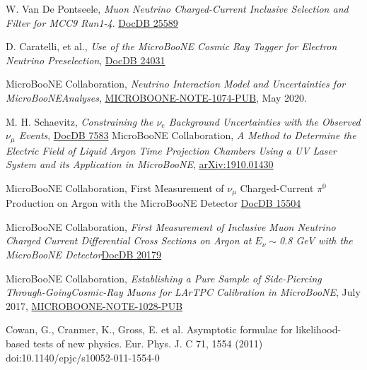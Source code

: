 \documentclass[a4paper]{article}
\begin{document}
\begin{thebibliography}{}
W. Van De Pontseele, \emph{Muon Neutrino Charged-Current Inclusive Selection and Filter for MCC9 Run1-4}. \href{https://microboone-docdb.fnal.gov/cgi-bin/private/ShowDocument?docid=25589}{DocDB 25589}

D. Caratelli, et al., \emph{Use of the MicroBooNE Cosmic Ray Tagger for Electron Neutrino Preselection}, \href{https://microboone-docdb.fnal.gov/cgi-bin/private/RetrieveFile?docid=24031&filename=CRTPACTechnote.pdf&version=1}{DocDB 24031}

MicroBooNE Collaboration, \emph{Neutrino Interaction Model and Uncertainties for MicroBooNEAnalyses}, \href{https://microboone.fnal.gov/wp-content/uploads/MICROBOONE-NOTE-1074-PUB.pdf}{MICROBOONE-NOTE-1074-PUB}, May 2020.

M. H. Schaevitz, \emph{Constraining the $\nu_e$ Background Uncertainties with the Observed $\nu_\mu$ Events}, \href{https://microboone-docdb.fnal.gov/cgi-bin/private/RetrieveFile?docid=7583}{DocDB 7583}
MicroBooNE Collaboration, \emph{A Method to Determine the Electric Field of Liquid Argon Time Projection Chambers Using a UV Laser System and its Application in MicroBooNE}, \href{https://arxiv.org/abs/1910.01430}{arXiv:1910.01430}

 MicroBooNE Collaboration, First Measurement of $\nu_\mu$ Charged-Current $\pi^0$ Production on Argon with the MicroBooNE Detector \href{https://microboone-docdb.fnal.gov/cgi-bin/private/RetrieveFile?docid=15504&filename=MicroBooNE_CCPizero_Run1_FinalVersion.pdf&version=17}{DocDB 15504}

 MicroBooNE Collaboration, \emph{First Measurement of Inclusive Muon Neutrino Charged Current Differential Cross Sections on Argon at $E_\nu \sim$0.8 GeV with the MicroBooNE Detector}\href{https://microboone-docdb.fnal.gov/cgi-bin/private/RetrieveFile?docid=20179&filename=ccinclusive_paper_prl_v4.9.pdf&version=19}{DocDB 20179}

MicroBooNE Collaboration, \emph{Establishing a Pure Sample of Side-Piercing Through-GoingCosmic-Ray Muons for LArTPC Calibration in MicroBooNE}, July 2017, \href{https://microboone.fnal.gov/wp-content/uploads/MICROBOONE-NOTE-1028-PUB.pdf}{MICROBOONE-NOTE-1028-PUB}

Cowan, G., Cranmer, K., Gross, E. et al. Asymptotic formulae for likelihood-based tests of new physics. Eur. Phys. J. C 71, 1554 (2011) doi:10.1140/epjc/s10052-011-1554-0


\end{thebibliography}
\end{document}
